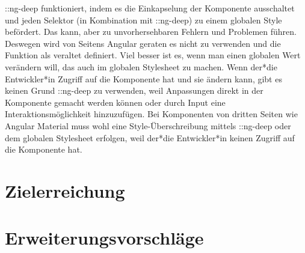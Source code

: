 ::ng-deep funktioniert, indem es die Einkapselung der Komponente ausschaltet und jeden Selektor (in Kombination mit ::ng-deep) zu einem globalen Style befördert. Das kann, aber zu unvorhersehbaren Fehlern und Problemen führen. Deswegen wird von Seitens Angular geraten es nicht zu verwenden und die Funktion als veraltet definiert. Viel besser ist es, wenn man einen globalen Wert verändern will, das auch im globalen Stylesheet zu machen.
Wenn der*die Entwickler*in Zugriff auf die Komponente hat und sie ändern kann, gibt es keinen Grund ::ng-deep zu verwenden, weil Anpassungen direkt in der Komponente gemacht werden können oder durch Input eine Interaktionsmöglichkeit hinzuzufügen. Bei Komponenten von dritten Seiten wie Angular Material muss wohl eine Style-Überschreibung mittels ::ng-deep oder dem globalen Stylesheet erfolgen, weil der*die Entwickler*in keinen Zugriff auf die Komponente hat. \cite{AngularComponentsStyleNgDEEP, UnderstandingNgDeep}

\section{Zielerreichung}
\section{Erweiterungsvorschläge} 

